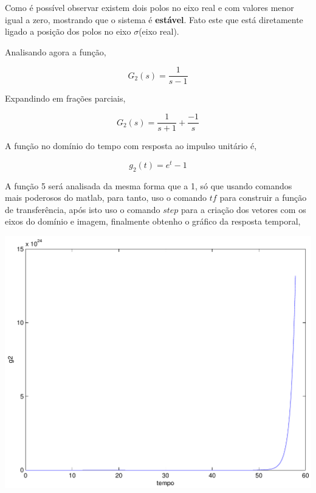 \documentclass[paper=a4, fontsize=11pt]{article}
\begin{document}
Como é possível observar existem dois polos no eixo real e com valores 
menor igual a zero, mostrando que o sistema é \textbf{estável}. Fato este
que está diretamente ligado a posição dos polos no eixo $\sigma$(eixo real).

Analisando agora a função,

\begin{equation}
    G_2(s) = \frac{1}{s-1}
\end{equation}

Expandindo em frações parciais,

\begin{equation}
    G_2(s) = \frac{1}{s+1} + \frac{-1}{s}
\end{equation}

A função no domínio do tempo com resposta ao impulso unitário é,

\begin{equation}
    g_2(t) =  e^{t} - 1
\end{equation}

A função 5 será analisada da mesma forma que a 1, só que usando comandos
mais poderosos do matlab, para tanto, uso o comando $tf$ para construir 
a função de transferência, após isto uso o comando $step$ para a criação
dos vetores com os eixos do domínio e imagem, finalmente obtenho o gráfico
da resposta temporal,

\begin{center}
    \includegraphics[scale=.5]{q1g2.pdf}
\end{center}
\end{document}
